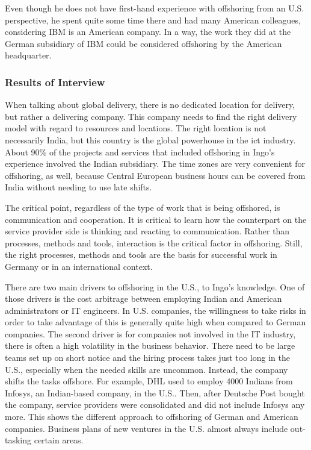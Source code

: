Even though he does not have first-hand experience with offshoring from an U.S. perspective, he spent quite some time there and had many American colleagues, considering IBM is an American company. In a way, the work they did at the German subsidiary of IBM could be considered offshoring by the American headquarter.

\subsubsection{Results of Interview}
When talking about global delivery, there is no dedicated location for delivery, but rather a delivering company. This company needs to find the right delivery model with regard to resources and locations. The right location is not necessarily India, but this country is the global powerhouse in the \gls{ict} industry. About 90\% of the projects and services that included offshoring in Ingo's experience involved the Indian subsidiary. The time zones are very convenient for offshoring, as well, because Central European business hours can be covered from India without needing to use late shifts.

The critical point, regardless of the type of work that is being offshored, is communication and cooperation. It is critical to learn how the counterpart on the service provider side is thinking and reacting to communication. Rather than processes, methods and tools, interaction is the critical factor in offshoring. Still, the right processes, methods and tools are the basis for successful work in Germany or in an international context.


There are two main drivers to offshoring in the U.S., to Ingo's knowledge. One of those drivers is the cost arbitrage between employing Indian and American administrators or IT engineers. In U.S. companies, the willingness to take risks in order to take advantage of this is generally quite high when compared to German companies. The second driver is for companies not involved in the IT industry, there is often a high volatility in the business behavior. There need to be large teams set up on short notice and the hiring process takes just too long in the U.S., especially when the needed skills are uncommon. Instead, the company shifts the tasks offshore. For example, DHL used to employ 4000 Indians from Infosys, an Indian-based company, in the U.S.. Then, after Deutsche Post bought the company, service providers were consolidated and did not include Infosys any more. This shows the different approach to offshoring of German and American companies. Business plans of new ventures in the U.S. almost always include out-tasking certain areas.


